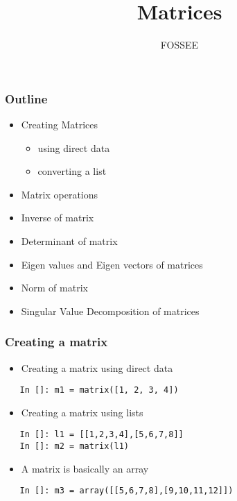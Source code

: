 \documentclass[presentation]{beamer}
\title{Matrices}
\author{FOSSEE}
\date{}
\begin{document}
\maketitle









\begin{frame}
\frametitle{Outline}
\label{sec-1}

\begin{itemize}
\item Creating Matrices

\begin{itemize}
\item using direct data
\item converting a list
\end{itemize}

\item Matrix operations
\item Inverse of matrix
\item Determinant of matrix
\item Eigen values and Eigen vectors of matrices
\item Norm of matrix
\item Singular Value Decomposition of matrices
\end{itemize}
\end{frame}
\begin{frame}[fragile]
\frametitle{Creating a matrix}
\label{sec-2}

\begin{itemize}
\item Creating a matrix using direct data
\end{itemize}

\begin{verbatim}
   In []: m1 = matrix([1, 2, 3, 4])
\end{verbatim}

\begin{itemize}
\item Creating a matrix using lists
\end{itemize}

\begin{verbatim}
   In []: l1 = [[1,2,3,4],[5,6,7,8]]
   In []: m2 = matrix(l1)
\end{verbatim}

\begin{itemize}
\item A matrix is basically an array
\end{itemize}

\begin{verbatim}
   In []: m3 = array([[5,6,7,8],[9,10,11,12]])
\end{verbatim}
\end{frame}
\end{document}
